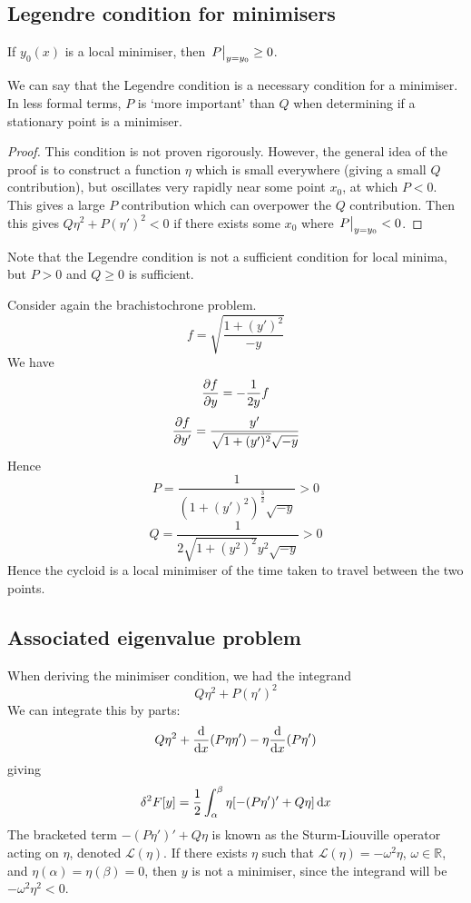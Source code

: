 \subsection{Legendre condition for minimisers}
\begin{proposition}
	If \( y_0(x) \) is a local minimiser, then \( \eval{P}_{y=y_0} \geq 0 \).
\end{proposition}
We can say that the Legendre condition is a necessary condition for a minimiser.
In less formal terms, \( P \) is `more important' than \( Q \) when determining if a stationary point is a minimiser.
\begin{proof}
	This condition is not proven rigorously.
	However, the general idea of the proof is to construct a function \( \eta \) which is small everywhere (giving a small \( Q \) contribution), but oscillates very rapidly near some point \( x_0 \), at which \( P < 0 \).
	This gives a large \( P \) contribution which can overpower the \( Q \) contribution.
	Then this gives \( Q\eta^2 + P(\eta')^2 < 0 \) if there exists some \( x_0 \) where \( \eval{P}_{y=y_0} < 0 \).
\end{proof}

Note that the Legendre condition is not a sufficient condition for local minima, but \( P > 0 \) and \( Q \geq 0 \) is sufficient.

\begin{example}
	Consider again the brachistochrone problem.
	\[
		f = \sqrt{\frac{1 + (y')^2}{-y}}
	\]
	We have
	\[
		\pdv{f}{y} = -\frac{1}{2y}f
	\]
	\[
		\pdv{f}{y'} = \frac{y'}{\sqrt{1+(y')^2}\sqrt{-y}}
	\]
	Hence
	\[
		P = \frac{1}{(1+(y')^2)^\frac{3}{2} \sqrt{-y}} > 0
	\]
	\[
		Q = \frac{1}{2\sqrt{1 + (y^2)^2}y^2 \sqrt{-y}} > 0
	\]
	Hence the cycloid is a local minimiser of the time taken to travel between the two points.
\end{example}

\subsection{Associated eigenvalue problem}
When deriving the minimiser condition, we had the integrand
\[
	Q\eta^2 + P(\eta')^2
\]
We can integrate this by parts:
\[
	Q\eta^2 + \dv{x} (P \eta \eta') - \eta \dv{x} (P \eta')
\]
giving
\[
	\delta^2 F[y] = \frac{1}{2}\int_\alpha^\beta \eta \qty[-(P\eta')' + Q\eta]\dd{x}
\]
The bracketed term \( -(P\eta')' + Q\eta \) is known as the Sturm-Liouville operator acting on \( \eta \), denoted \( \mathcal L(\eta) \).
If there exists \( \eta \) such that \( \mathcal L(\eta) = -\omega^2\eta \), \( \omega \in \mathbb R\), and \( \eta(\alpha) = \eta(\beta) = 0 \), then \( y \) is not a minimiser, since the integrand will be \( -\omega^2\eta^2 < 0 \).

